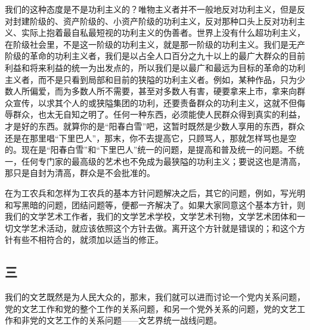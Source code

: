 我们的这种态度是不是功利主义的？唯物主义者并不一般地反对功利主义，但是反对封建阶级的、资产阶级的、小资产阶级的功利主义，反对那种口头上反对功利主义、实际上抱着最自私最短视的功利主义的伪善者。世界上没有什么超功利主义，在阶级社会里，不是这一阶级的功利主义，就是那一阶级的功利主义。我们是无产阶级的革命的功利主义者，我们是以占全人口百分之九十以上的最广大群众的目前利益和将来利益的统一为出发点的，所以我们是以最广和最远为目标的革命的功利主义者，而不是只看到局部和目前的狭隘的功利主义者。例如，某种作品，只为少数人所偏爱，而为多数人所不需要，甚至对多数人有害，硬要拿来上市，拿来向群众宣传，以求其个人的或狭隘集团的功利，还要责备群众的功利主义，这就不但侮辱群众，也太无自知之明了。任何一种东西，必须能使人民群众得到真实的利益，才是好的东西。就算你的是“阳春白雪”吧，这暂时既然是少数人享用的东西，群众还是在那里唱“下里巴人”，那末，你不去提高它，只顾骂人，那就怎样骂也是空的。现在是“阳春白雪”和“下里巴人”统一的问题，是提高和普及统一的问题。不统一，任何专门家的最高级的艺术也不免成为最狭隘的功利主义；要说这也是清高，那只是自封为清高，群众是不会批准的。

在为工农兵和怎样为工农兵的基本方针问题解决之后，其它的问题，例如，写光明和写黑暗的问题，团结问题等，便都一齐解决了。如果大家同意这个基本方针，则我们的文学艺术工作者，我们的文学艺术学校，文学艺术刊物，文学艺术团体和一切文学艺术活动，就应该依照这个方针去做。离开这个方针就是错误的；和这个方针有些不相符合的，就须加以适当的修正。

\subsection*{三}

我们的文艺既然是为人民大众的，那末，我们就可以进而讨论一个党内关系问题，党的文艺工作和党的整个工作的关系问题，和另一个党外关系的问题，党的文艺工作和非党的文艺工作的关系问题——文艺界统一战线问题。

